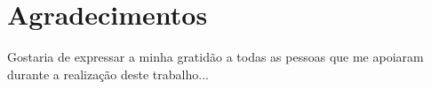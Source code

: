 \chapter*{Agradecimentos}
Gostaria de expressar a minha gratidão a todas as pessoas que me apoiaram durante a realização deste trabalho...
